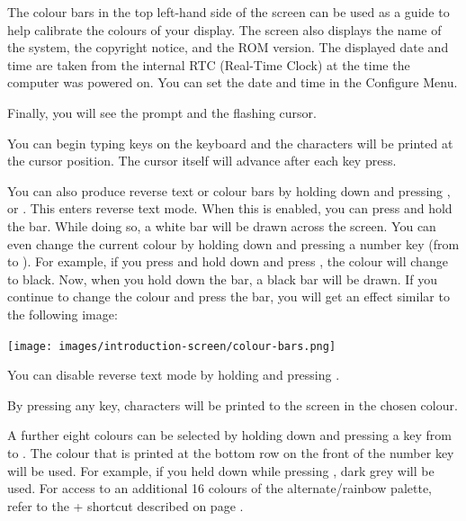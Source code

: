 The colour bars in the top left-hand side of the screen can be used as a guide to help calibrate the colours of your display. The screen also displays the name of the system, the copyright notice, and the ROM version. The displayed date and time are taken from the internal RTC (Real-Time Clock) at the time the computer was powered on. You can set the date and time in the Configure Menu.

Finally, you will see the  prompt and the flashing cursor.

You can begin typing keys on the keyboard and the characters will be
printed at the cursor position. The cursor itself will advance after
each key press.

You can also produce reverse text or colour bars by holding down  and pressing , or . This enters reverse text mode. When this is enabled, you can press and hold the  bar. While doing so, a white bar will be drawn across the screen.
You can even change the current colour by holding  down and pressing a number key (from 
to ). For example, if you press and hold  down and press , the colour will
change to black. Now, when you hold down the  bar, a black bar will be drawn. If you continue to
change the colour and press the  bar, you will get an effect similar to the following image:

\begin{center}
\texttt{[image: images/introduction-screen/colour-bars.png]}
\end{center}

You can disable reverse text mode by holding  and pressing .

By pressing any key, characters will be printed to the screen in the chosen colour.

A further eight colours can be selected by holding down \megasymbolkey and pressing a key from  to .
The colour that is printed at the bottom row on the front of the number key will be used. For example, if you held
\megasymbolkey down while pressing , dark grey will be used. For access to an additional 16 colours of the alternate/rainbow palette, refer to the  +  shortcut described on page \pageref{appendix:controlcodes}.


